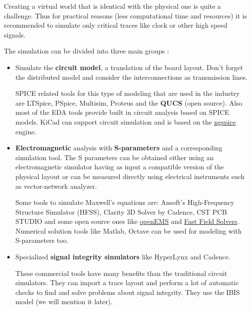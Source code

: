 \documentclass[final]{cubedoc}
\begin{document}
	Creating a virtual world that is identical with the physical one is quite a challenge. Thus for practical reasons (less computational time and resources) it is recommended to simulate only critical traces like clock or other high speed signals.
	
	The simulation can be divided into three main groups \cite{bogatin2009signal, sigcon:simulation}: 
	
	\begin{itemize}
		\item Simulate the \textbf{circuit model}, a translation of the board layout. 
		Don't forget the distributed model and consider the interconnections as transmission lines.
		
		SPICE related tools for this type of modeling that are used in the industry are LTSpice, PSpice, Multisim, Proteus and the \textbf{QUCS} (open source). Also most of the EDA tools provide built in circuit analysis based on SPICE models. KiCad can support circuit simulation and is based on the \href{http://ngspice.sourceforge.net/ngspice-eeschema.html}{ngspice} engine.
		
		
		\item \textbf{Electromagnetic} analysis with \textbf{S-parameters} and a corresponding simulation tool. The S parameters can be obtained either using an electromagnetic simulator having as input a compatible version of the physical layout or can be measured directly using electrical instruments such as vector-network analyzer. 
		
		Some tools to simulate Maxwell's equations are: Ansoft’s High-Frequency Structure Simulator (HFSS), Clarity 3D Solver by Cadence, CST PCB STUDIO and some open source ones like \href{https://www.opensourceimaging.org/project/open-ems-a-free-and-open-electromagnetic-field-solver/}{openEMS} and \href{https://www.fastfieldsolvers.com/}{Fast Field Solvers}.
		Numerical solution tools like Matlab, Octave can be used for modeling with S-parameters too.
		
		\item Specialized \textbf{signal integrity simulators} like HyperLynx and Cadence.
		
		These commercial tools have many benefits than the traditional circuit simulators. They can import a trace layout and perform a lot of automatic checks to find and solve problems about signal integrity. They use the IBIS model (we will mention it later).
	\end{itemize}
	
\end{document}
